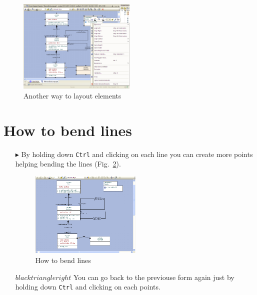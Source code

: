  \begin{figure}[htbp]
\begin{center}
  \includegraphics[width=0.5\textwidth]{pics/tricks/layoutElements/layoutElements2}
  \caption{Another way to layout elements}  
  \label{fig_layout02} 
\end{center}
\end{figure}


\section{How to bend lines}
\begin{enumerate}
\item[$\blacktriangleright$]By holding down \texttt{Ctrl} and clicking on each line you can create more points helping bending the lines (Fig.~\ref{fig_bendLine01}).
 
\begin{figure}[htbp]
\begin{center}
  \includegraphics[width=0.5\textwidth]{pics/tricks/bendLine/bendLine1}
  \caption{How to bend lines}   
  \label{fig_bendLine01}
\end{center}
\end{figure}

\item[$blacktriangleright$] You can go back to the previouse form again just by
holding down \texttt{Ctrl} and clicking on each points.
\end{enumerate}


